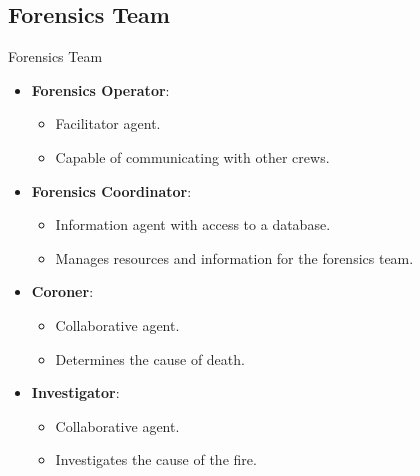\subsection{Forensics Team}
\begin{frame}{Forensics Team}
    \begin{itemize}
        \item \textbf{Forensics Operator}:
        \begin{itemize}
            \item \alert{Facilitator} agent.
            \item Capable of \alert{communicating} with other crews.
        \end{itemize}
        \item \textbf{Forensics Coordinator}:
        \begin{itemize}
            \item \alert{Information} agent with access to a \alert{database}.
            \item Manages resources and information for the forensics team.
        \end{itemize}
        \item \textbf{Coroner}:
        \begin{itemize}
            \item \alert{Collaborative} agent.
            \item Determines the cause of death.
        \end{itemize}
        \item \textbf{Investigator}:
        \begin{itemize}
            \item \alert{Collaborative} agent.
            \item Investigates the cause of the fire.
        \end{itemize}
    \end{itemize}
    
\end{frame} 